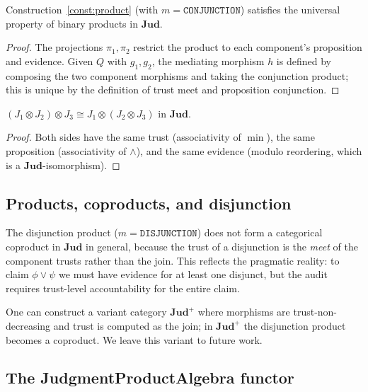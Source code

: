 \documentclass[11pt]{article}
\newcommand{\Jprod}{\mathbin{\otimes}}            %
\newcommand{\conj}{\mathbin{\wedge}}              %
\newcommand{\ProdCat}{\mathbf{Jud}}               %
\newcommand{\ProjL}{\pi_1}                        %
\newcommand{\ProjR}{\pi_2}                        %
\begin{document}
\begin{proposition}
\label{prop:universal}
Construction~\ref{const:product} (with $m = \texttt{CONJUNCTION}$)
satisfies the universal property of binary products in $\ProdCat$.
\end{proposition}
\begin{proof}
The projections $\ProjL, \ProjR$ restrict the product to each
component's proposition and evidence.  Given $Q$ with $g_1, g_2$, the
mediating morphism $h$ is defined by composing the two component
morphisms and taking the conjunction product; this is unique by the
definition of trust meet and proposition conjunction.
\end{proof}

\begin{corollary}
\label{cor:assoc}
$(J_1 \Jprod J_2) \Jprod J_3 \cong J_1 \Jprod (J_2 \Jprod J_3)$ in
$\ProdCat$.
\end{corollary}
\begin{proof}
Both sides have the same trust (associativity of $\min$), the same
proposition (associativity of $\conj$), and the same evidence (modulo
reordering, which is a $\ProdCat$-isomorphism).
\end{proof}

\subsection{Products, coproducts, and disjunction}

The disjunction product ($m = \texttt{DISJUNCTION}$) does not form a
categorical coproduct in $\ProdCat$ in general, because the trust of
a disjunction is the \emph{meet} of the component trusts rather than
the join.  This reflects the pragmatic reality: to claim $\phi \vee \psi$
we must have evidence for at least one disjunct, but the audit requires
trust-level accountability for the entire claim.

\begin{remark}
One can construct a variant category $\ProdCat^+$ where morphisms are
trust-non-decreasing and trust is computed as the join; in $\ProdCat^+$
the disjunction product becomes a coproduct.  We leave this variant to
future work.
\end{remark}

\subsection{The JudgmentProductAlgebra functor}
\end{document}
